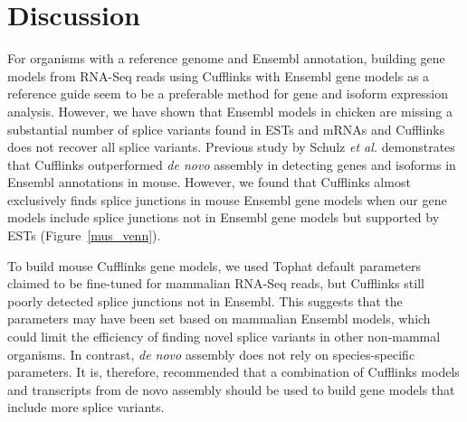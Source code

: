 \documentclass[10pt]{article}
\begin{document}
% 
% 
% 
% 


\section*{Discussion}

For organisms with a reference genome and Ensembl annotation, building gene
models from RNA-Seq reads using Cufflinks with Ensembl gene models as a
reference guide seem to be a preferable method for gene and isoform expression
analysis.  However, we have shown that Ensembl models in chicken are missing a
substantial number of splice variants found in ESTs and mRNAs and Cufflinks does
not recover all splice variants.  Previous study by Schulz \emph{et
al.}\cite{Schulz:2012je} demonstrates that Cufflinks outperformed \emph{de novo}
assembly in detecting genes and isoforms in Ensembl annotations in mouse.
However, we found that Cufflinks almost exclusively finds splice junctions in
mouse Ensembl gene models when our gene models include splice junctions not in
Ensembl gene models but supported by ESTs (Figure~\ref{mus_venn}). 

To build mouse Cufflinks gene models, we used Tophat default parameters claimed
to be fine-tuned for mammalian RNA-Seq reads, but Cufflinks still poorly
detected splice junctions not in Ensembl.  This suggests that the parameters may
have been set based on mammalian Ensembl models, which could limit the
efficiency of finding novel splice variants in other non-mammal organisms.  In
contrast, {\em de novo} assembly does not rely on species-specific parameters.
It is, therefore, recommended that a combination of Cufflinks models and
transcripts from de novo assembly should be used to build gene models that
include more splice variants.
\end{document}
